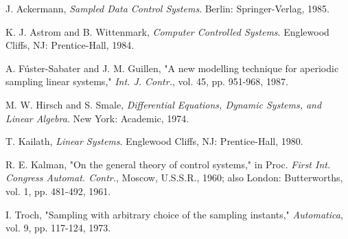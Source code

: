 \documentclass{article}
\begin{document}
\begin{thebibliography}{9}

 J. Ackermann, \textit{Sampled Data Control Systems}. Berlin:
Springer-Verlag, 1985.

 K. J. Astrom and B. Wittenmark, \textit{Computer Controlled Systems}.
Englewood Cliffs, NJ: Prentice-Hall, 1984.

 A. F\'uster-Sabater and J. M. Guillen, "A new modelling technique for
aperiodic sampling linear systems," \textit{Int. J. Contr.}, vol.
45, pp. 951-968, 1987.

 M. W. Hirsch and S. Smale, \textit{Differential Equations, Dynamic
Systems, and Linear Algebra}. New York: Academic, 1974.

 T. Kailath, \textit{Linear Systems}. Englewood
Cliffs, NJ: Prentice-Hall, 1980.

 R. E. Kalman, "On the general theory of control systems," in
Proc. \textit{First Int. Congress Automat. Contr.}, Moscow,
U.S.S.R., 1960; also London: Butterworths, vol. 1, pp.
481-492, 1961.

 I. Troch, "Sampling with arbitrary choice of the sampling
instants," \textit{Automatica}, vol. 9, pp. 117-124, 1973.

\end{thebibliography}
\end{document}
